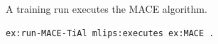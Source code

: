 A training run executes the MACE algorithm.
\begin{lstlisting}[language=turtle]
ex:run-MACE-TiAl mlips:executes ex:MACE .
\end{lstlisting}
